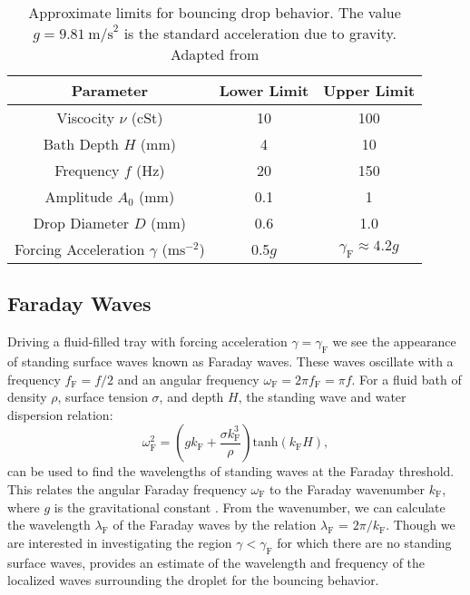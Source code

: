 	       \begin{table}[htdp] 
\caption[Basic Table 1]{Approximate limits for bouncing drop behavior. The value $g = 9.81~\mathrm{m/s}^{2}$ is the standard acceleration due to gravity. Adapted from \cite{pilot-wave}} 
\begin{center} 
\begin{tabular}{c c c} 
\toprule 
  Parameter &  Lower Limit & Upper Limit \\
  \midrule
Viscocity $\nu$ (cSt) & 10 & 100 \\ 
Bath Depth $H$ (mm) & 4 & 10 \\
Frequency $f$ (Hz) & 20 & 150 \\
Amplitude $A_0$ (mm) & 0.1 & 1 \\
Drop Diameter $D$ (mm) & 0.6 & 1.0 \\
Forcing Acceleration $\gamma$ ($\mathrm{ms}^{-2}$) & 0.5$g$ & $\gamma_\mathrm{F} \approx 4.2g$ \\
\bottomrule 
\end{tabular}
\end{center}
\label{approxlimits} 
\end{table}	

\subsection{Faraday Waves}
Driving a fluid-filled tray with forcing acceleration $\gamma = \gamma_\mathrm{F}$ we see the appearance of standing surface waves known as Faraday waves. These waves oscillate with a  frequency $f_\mathrm{F} = f/2$ and an angular frequency $\omega_\mathrm{F} = 2\pi f_\mathrm{F}=\pi f$. For a fluid bath of density $\rho$, surface tension $\sigma$, and depth $H$, the standing wave and water dispersion relation:
\begin{equation} \label{dispersion}
\omega_\mathrm{F}^2 = \left(gk_\mathrm{F}+\frac{\sigma k_\mathrm{F}^3}{\rho}\right)\mathrm{tanh}(k_\mathrm{F}H),
\end{equation} 
can be used to find the wavelengths of standing waves at the Faraday threshold. This relates the angular Faraday frequency $\omega_\mathrm{F}$ to the Faraday wavenumber $k_\mathrm{F}$, where $g$ is the gravitational constant . From the wavenumber, we can calculate the wavelength $\lambda_\mathrm{F}$ of the Faraday waves by the relation $\lambda_\mathrm{F}$ = $2\pi/k_\mathrm{F}$. Though we are interested in investigating the region $\gamma < \gamma_\mathrm{F}$ for which there are no standing surface waves,  provides an estimate of the wavelength and frequency of the localized waves surrounding the droplet for the bouncing behavior. 


